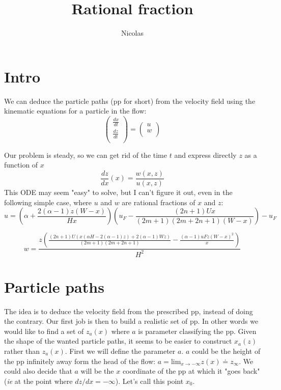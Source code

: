 \documentclass[11pt]{article}
\title{\textbf{Rational fraction}}
\author{Nicolas}
\date{}
\begin{document}
\maketitle

\section{Intro}

We can deduce the particle paths (pp for short) from the velocity field using the kinematic equations for a particle in the flow:
\[
\begin{pmatrix}
	\frac{dx}{dt} \\
	\frac{dz}{dt} \\
\end{pmatrix}
=
\begin{pmatrix}
	u \\
	w \\
\end{pmatrix}
\]

Our problem is steady, so we can get rid of the time $t$ and express directly $z$ as a function of $x$ 
\[
\frac{dz}{dx}(x) = \frac{w(x, z)}{u(x, z)}
\]
This ODE may seem "easy" to solve, but I can't figure it out, even in the following simple case, where $u$ and $w$ are rational fractions of $x$ and $z$:
\[
 u =
 \left(
 \alpha 
 +\frac{2 (\alpha -1) z (W-x)}{H x}
 \right) 
 \left(
 u_F
 -\frac{(2 n+1) U x}{(2 m+1) (2 m+2 n+1) (W-x)}
 \right)-u_F
\]

\[
 w = 
 \frac{z \left(\frac{(2 n+1) U (x (\alpha  H-2 (\alpha -1) z)+2 (\alpha -1) W z)}{(2 m+1) (2 m+2 n+1)}-\frac{(\alpha -1) uF z (W-x)^2}{x}\right)}{H^2}
 \]
 
 
\section{Particle paths}

The idea is to deduce the velocity field from the prescribed pp, instead of doing the contrary.
Our first job is then to build a realistic set of pp. 
In other words we would like to find a set of $z_a(x)$ where $a$ is parameter classifying the pp.
Given the shape of the wanted particle paths, it seems to be easier to construct $x_a(z)$ rather than $z_a(x)$.
First we will define the parameter $a$. $a$ could be the height of the pp infinitely away form the head of the flow: $a = \text{lim}_{x \rightarrow -\infty} z(x) \doteq z_\infty$. We could also decide that $a$ will be the $x$ coordinate of the pp at which it "goes back" (\textit{ie} at the point where $dz/dx = - \infty$). 
Let's call this point $x_0$.
\end{document}
